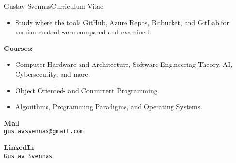 \documentclass{article}
\begin{document}
\begin{cv}{Gustav Svennas}{Curriculum Vitae}

\begin{cvevent}[2023-04][2023-06]
    \begin{itemize}
        \item Study where the tools GitHub, Azure Repos, Bitbucket, and GitLab for version control were compared and examined.
    \end{itemize}
\end{cvevent}

\begin{cvevent}[2018-09][2023-06]
    \textbf{Courses:}
    \begin{itemize}
        \item Computer Hardware and Architecture, Software Engineering Theory, AI, Cybersecurity, and more.
        \item Object Oriented- and Concurrent Programming. 
        \item Algorithms, Programming Paradigms, and Operating Systems.
    \end{itemize}
\end{cvevent}


\begin{cvevent}[2017-06][2020-06]
\end{cvevent}


\cvsidebar %



\begin{cvitem}[Envelope][4]
    \textbf{Mail}\\
    \href{mailto:gustavsvennas@gmail.com}{\texttt{gustavsvennas@gmail.com}}
\end{cvitem}

\cvseparator[3]
\begin{cvitem}[Globe][4]
    \textbf{LinkedIn}\\
    \href{https://www.linkedin.com/in/gustav-svennas-18b575159}{\texttt{Gustav Svennas}}
\end{cvitem}


\end{cv}
\end{document}
